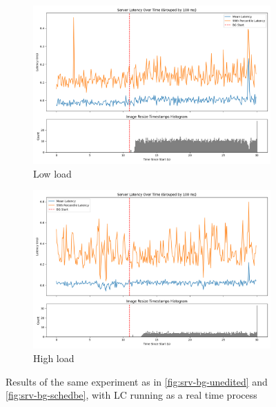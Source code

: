 \begin{figure}[t]
    \centering
    \begin{subfigure}[t]{\columnwidth}
        \includegraphics[width=\columnwidth]{graphs/srv-bg-rt-low.png}
        \caption{Low load}\label{fig:srv-bg-rt-low}
        \vspace{12pt}
    \end{subfigure}
    \hspace{\fill}
    \begin{subfigure}[t]{\columnwidth}
        \includegraphics[width=\columnwidth]{graphs/srv-bg-rt-high.png}
        \caption{High load}\label{fig:srv-bg-rt-high}
    \end{subfigure}
    \vspace{4pt}
    \caption{Results of the same experiment as in \autoref{fig:srv-bg-unedited}
    and \autoref{fig:srv-bg-schedbe}, with LC running as a real time
    process}\label{fig:srv-bg-rt}
\end{figure}

